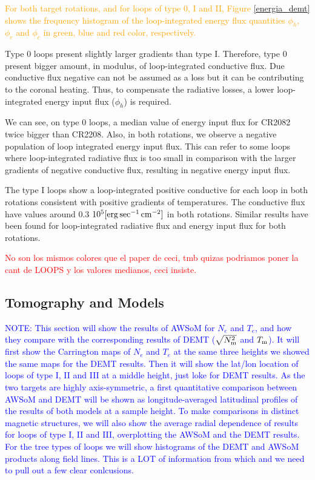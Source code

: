 \documentclass[namedreferences]{solarphysics}
\newcommand{\Tm}{T_{\rm m}}
\newcommand{\Nsqm}{N^2_{{\rm m}}}
\newcommand{\sqravgN}{\sqrt{\Nsqm}}
\def\diego#1{\textcolor{red}{#1}}
\def\albert#1{\textcolor{orange}{#1}}
\def\notebyalbert#1{\textcolor{blue}{NOTE: #1}}
\begin{document}
\begin{article}
\albert{For both target rotations, and for loops of type 0, I and II, Figure \ref{energia_demt} shows the frequency histogram of the loop-integrated energy flux quantities $\phi_h$, $\phi_r$ and $\phi_c$ in green, blue and red color, respectively.}

Type 0 loops present slightly larger gradients than type I. Therefore, type 0 present bigger amount, in modulus, of loop-integrated conductive flux. Due conductive flux negative can not be assumed as a loss but it can be contributing to the coronal heating. Thus, to compensate the radiative losses, a lower loop-integrated energy input flux ($\phi_h$) is required.

We can see, on type 0 loops, a median value of energy input flux for CR2082 twice bigger than CR2208. Also, in both rotations, we observe a negative population of loop integrated energy input flux. This can refer to some loops where loop-integrated radiative flux is too small in comparison with the larger gradients of negative conductive flux, resulting in negative energy input flux. 

The type I loops show a loop-integrated positive conductive for each loop in both rotations consistent with positive gradients of temperatures. The conductive flux have values around 0.3 $10^{5}[\rm{erg\,sec^{-1}\,cm^{-2}}]$ in both rotations. Similar results have been found for loop-integrated radiative flux and energy input flux for both rotations.


\diego{No son los mismos colores que el paper de ceci, tmb quizas podriamos poner la cant de LOOPS y los valores medianos, ceci insiste.}


\subsection{Tomography and Models}\label{awsom_res} 

\noindent\notebyalbert{This section will show the results of AWSoM for $N_e$ and $T_e$, and how they compare with the corresponding results of DEMT ($\sqravgN$ and $\Tm$). It will first show the Carrington maps of $N_e$ and $T_e$ at the same three heights we showed the same maps for the DEMT results. Then it will show the lat/lon location of loops of type I, II and III at a middle height, just loke for DEMT results. As the two targets are highly axis-symmetric, a first quantitative comparison between AWSoM and DEMT will be shown as longitude-averaged latitudinal profiles of the results of both models at a sample height. To make comparisons in distinct magnetic structures, we will also show the average radial dependence of results for loops of type I, II and III, overplotting the AWSoM and the DEMT results. For the tree types of loops we will show histograms of the DEMT and AWSoM products along field lines. This is a LOT of information from which and we need to pull out a few clear conlcusions.}


\end{article}
\end{document}
